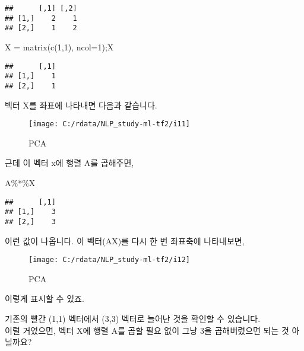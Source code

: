 \documentclass[
]{article}
\newenvironment{Shaded}{\begin{snugshade}}{\end{snugshade}}
\newcommand{\AttributeTok}[1]{\textcolor[rgb]{0.77,0.63,0.00}{#1}}
\newcommand{\DecValTok}[1]{\textcolor[rgb]{0.00,0.00,0.81}{#1}}
\newcommand{\FunctionTok}[1]{\textcolor[rgb]{0.00,0.00,0.00}{#1}}
\newcommand{\NormalTok}[1]{#1}
\newcommand{\OtherTok}[1]{\textcolor[rgb]{0.56,0.35,0.01}{#1}}
\newcommand{\SpecialCharTok}[1]{\textcolor[rgb]{0.00,0.00,0.00}{#1}}
\begin{document}
\begin{verbatim}
##      [,1] [,2]
## [1,]    2    1
## [2,]    1    2
\end{verbatim}

\begin{Shaded}
\begin{Highlighting}[]
\NormalTok{X }\OtherTok{=} \FunctionTok{matrix}\NormalTok{(}\FunctionTok{c}\NormalTok{(}\DecValTok{1}\NormalTok{,}\DecValTok{1}\NormalTok{), }\AttributeTok{ncol=}\DecValTok{1}\NormalTok{);X}
\end{Highlighting}
\end{Shaded}

\begin{verbatim}
##      [,1]
## [1,]    1
## [2,]    1
\end{verbatim}

벡터 X를 좌표에 나타내면 다음과 같습니다.

\begin{figure}

{\centering \texttt{[image: C:/rdata/NLP\_study-ml-tf2/i11]} 

}

\caption{PCA}\label{fig:unnamed-chunk-7}
\end{figure}

근데 이 벡터 x에 행렬 A를 곱해주면,

\begin{Shaded}
\begin{Highlighting}[]
\NormalTok{A}\SpecialCharTok{\%*\%}\NormalTok{X}
\end{Highlighting}
\end{Shaded}

\begin{verbatim}
##      [,1]
## [1,]    3
## [2,]    3
\end{verbatim}

이런 값이 나옵니다. 이 벡터(AX)를 다시 한 번 좌표축에 나타내보면,

\begin{figure}

{\centering \texttt{[image: C:/rdata/NLP\_study-ml-tf2/i12]} 

}

\caption{PCA}\label{fig:unnamed-chunk-9}
\end{figure}

이렇게 표시할 수 있죠.

기존의 빨간 (1,1) 벡터에서 (3,3) 벡터로 늘어난 것을 확인할 수
있습니다.\\
이럴 거였으면, 벡터 X에 행렬 A를 곱할 필요 없이 그냥 3을 곱해버렸으면
되는 것 아닐까요?
\end{document}
